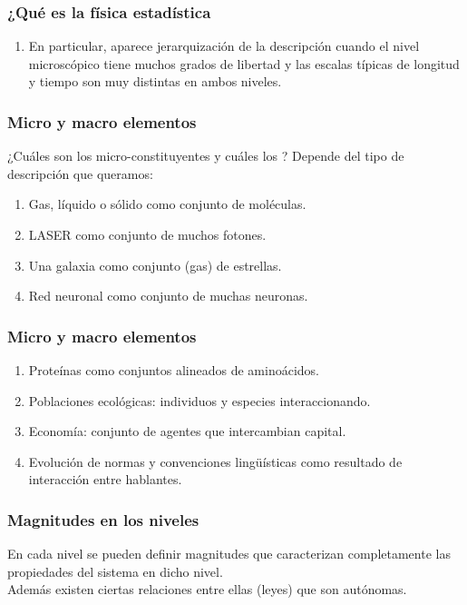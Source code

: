 \documentclass[12pt]{beamer}
\begin{document}
\begin{frame}
\frametitle{¿Qué es la física estadística}
\begin{enumerate}[<+->]
\conti
\item  En particular, aparece jerarquización de la descripción cuando el nivel microscópico tiene muchos grados de libertad y las escalas típicas de longitud y tiempo son muy distintas en ambos niveles.
\end{enumerate}
\end{frame}
\begin{frame}
\frametitle{Micro y macro elementos}
¿Cuáles son los \textcolor{cerise}{micro-constituyentes} y cuáles los ? \pause Depende del tipo de descripción que queramos:
\pause
{}
\begin{enumerate}[<+->]
\item Gas, líquido o sólido como conjunto de moléculas.
\item LASER como conjunto de muchos fotones.
\item Una galaxia como conjunto (gas) de estrellas.
\item Red neuronal como conjunto de muchas neuronas.
\seti
\end{enumerate}
\end{frame}
\begin{frame}
\frametitle{Micro y macro elementos}
\begin{enumerate}[<+->]
\conti
\item Proteínas como conjuntos alineados de aminoácidos.
\item Poblaciones ecológicas: individuos y especies interaccionando.
\item Economía: conjunto de agentes que intercambian capital.
\item Evolución de normas y convenciones lingüísticas como resultado de interacción entre hablantes.
\end{enumerate}
\end{frame}
\begin{frame}
\frametitle{Magnitudes en los niveles}
En cada nivel se pueden definir magnitudes que caracterizan completamente las propiedades del sistema en dicho nivel.
\\
\bigskip
\pause
Además existen ciertas relaciones entre ellas (leyes) que son autónomas.
\end{frame}
\end{document}
